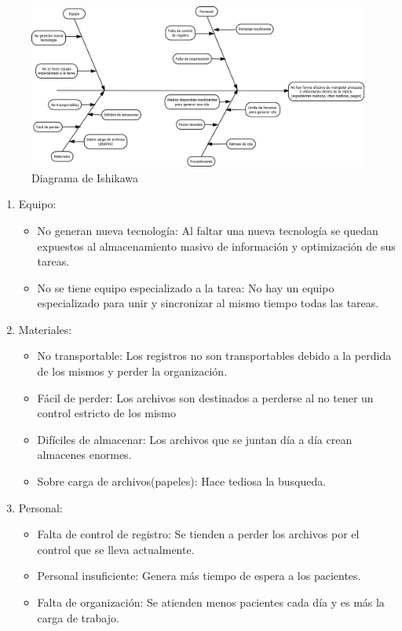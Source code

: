\begin{figure}[htbp!]
		\includegraphics[width=1\textwidth]{images/ishikawa_consultas}
		\caption{Diagrama de Ishikawa}
	\end{figure}
\begin{enumerate}
\item Equipo:
\begin{itemize}
\item No generan nueva tecnología: Al faltar una nueva tecnología se quedan expuestos al almacenamiento masivo de información y optimización de sus tareas.
\item No se tiene equipo especializado a la tarea: No hay un equipo especializado para unir y sincronizar al mismo tiempo todas las tareas.
\end{itemize}
\item Materiales:
\begin{itemize}
\item No transportable: Los registros no son transportables debido a la perdida de los mismos y perder la organización.
\item Fácil de perder: Los archivos son destinados a perderse al no tener un control estricto de los mismo
\item Difíciles de almacenar: Los archivos que se juntan día a día crean almacenes enormes.
\item Sobre carga de archivos(papeles): Hace tediosa la busqueda.
\end{itemize}
\item Personal:
\begin{itemize}
\item Falta de control de registro: Se tienden a perder los archivos por el control que se lleva actualmente.
\item Personal insuficiente: Genera más tiempo de espera a los pacientes. 
\item Falta de organización: Se atienden menos pacientes cada día y es más la carga de trabajo.

\end{itemize}
\end{enumerate}
